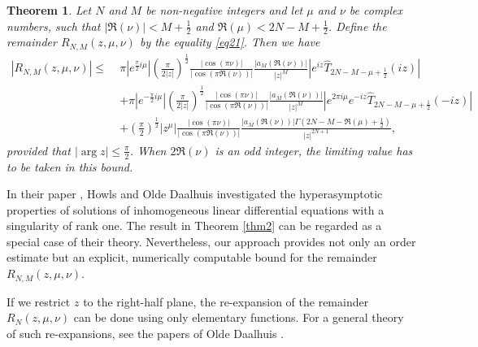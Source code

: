 \documentclass[a4paper,twoside,10pt]{amsart}
\newtheorem{theorem}{Theorem}[section]
\numberwithin{equation}{section}
\begin{document}
\begin{theorem}\label{thm3} Let $N$ and $M$ be non-negative integers and let $\mu$ and $\nu$ be complex numbers, such that $\left| {\Re \left( \nu  \right)} \right| < M + \frac{1}{2}$ and $\Re \left( \mu  \right) < 2N - M + \frac{1}{2}$. Define the remainder $R_{N,M} \left( {z,\mu ,\nu } \right)$ by the equality \eqref{eq21}. Then we have
\begin{align*}
\left| {R_{N,M} \left( {z,\mu ,\nu } \right)} \right| \le \; & \pi \left| {e^{\frac{\pi }{2}i\mu } } \right|\left( {\frac{\pi }{{2\left| z \right|}}} \right)^{\frac{1}{2}} \frac{{\left| {\cos \left( {\pi \nu } \right)} \right|}}{{\left| {\cos \left( {\pi \Re \left( \nu  \right)} \right)} \right|}}\frac{{\left| {a_M \left( \Re \left( \nu  \right) \right)} \right|}}{{\left| z \right|^M }}\left| {e^{iz} \widehat T_{2N - M - \mu  + \frac{1}{2}} \left( {iz} \right)} \right| \\ & + \pi \left| {e^{ - \frac{\pi }{2}i\mu } } \right|\left( {\frac{\pi }{{2\left| z \right|}}} \right)^{\frac{1}{2}} \frac{{\left| {\cos \left( {\pi \nu } \right)} \right|}}{{\left| {\cos \left( {\pi \Re \left( \nu  \right)} \right)} \right|}}\frac{{\left| {a_M \left( \Re \left( \nu  \right) \right)} \right|}}{{\left| z \right|^M }}\left| {e^{2\pi i\mu } e^{ - iz} \widehat T_{2N - M - \mu  + \frac{1}{2}} \left( { - iz} \right)} \right|
\\ & + \left( {\frac{\pi }{2}} \right)^{\frac{1}{2}} \left| {z^\mu  } \right|\frac{{\left| {\cos \left( {\pi \nu } \right)} \right|}}{{\left| {\cos \left( {\pi \Re \left( \nu  \right)} \right)} \right|}}\frac{{\left| {a_M \left( \Re \left( \nu  \right) \right)} \right|\Gamma \left( {2N - M - \Re \left( \mu  \right) + \frac{1}{2}} \right)}}{{\left| z \right|^{2N + 1} }},
\end{align*}
provided that $\left|\arg z\right| \leq \frac{\pi}{2}$. When $2\Re\left(\nu\right)$ is an odd integer, the limiting value has to be taken in this bound.
\end{theorem}

In their paper \cite{Howls}, Howls and Olde Daalhuis investigated the hyperasymptotic properties of solutions of inhomogeneous linear differential equations with a singularity of rank one. The result in Theorem \ref{thm2} can be regarded as a special case of their theory. Nevertheless, our approach provides not only an order estimate but an explicit, numerically computable bound for the remainder $R_{N,M} \left( {z,\mu ,\nu } \right)$.

If we restrict $z$ to the right-half plane, the re-expansion of the remainder $R_{N} \left( {z,\mu ,\nu } \right)$ can be done using only elementary functions. For a general theory of such re-expansions, see the papers of Olde Daalhuis \cite{Olde Daalhuis1,Olde Daalhuis2}.
\end{document}
